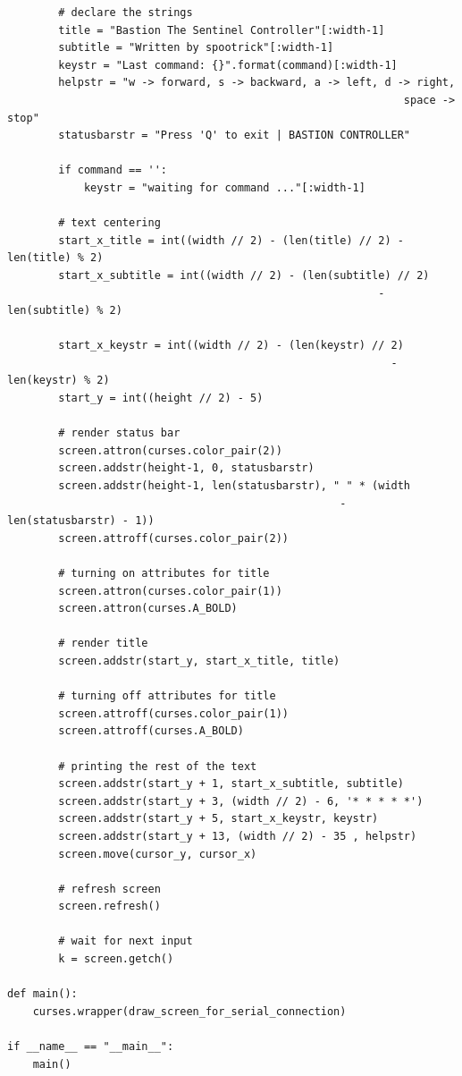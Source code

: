 \documentclass[12pt,a4paper]{article}
\begin{document}
\begin{verbatim}
        # declare the strings
        title = "Bastion The Sentinel Controller"[:width-1]
        subtitle = "Written by spootrick"[:width-1]
        keystr = "Last command: {}".format(command)[:width-1]
        helpstr = "w -> forward, s -> backward, a -> left, d -> right, 
                                                              space -> stop"
        statusbarstr = "Press 'Q' to exit | BASTION CONTROLLER"

        if command == '':
            keystr = "waiting for command ..."[:width-1]

        # text centering
        start_x_title = int((width // 2) - (len(title) // 2) - len(title) % 2)
        start_x_subtitle = int((width // 2) - (len(subtitle) // 2) 
                                                          - len(subtitle) % 2)
                                                          
        start_x_keystr = int((width // 2) - (len(keystr) // 2) 
                                                            - len(keystr) % 2)
        start_y = int((height // 2) - 5)

        # render status bar
        screen.attron(curses.color_pair(2))
        screen.addstr(height-1, 0, statusbarstr)
        screen.addstr(height-1, len(statusbarstr), " " * (width
                                                    - len(statusbarstr) - 1))
        screen.attroff(curses.color_pair(2))

        # turning on attributes for title
        screen.attron(curses.color_pair(1))
        screen.attron(curses.A_BOLD)

        # render title
        screen.addstr(start_y, start_x_title, title)

        # turning off attributes for title
        screen.attroff(curses.color_pair(1))
        screen.attroff(curses.A_BOLD)

        # printing the rest of the text
        screen.addstr(start_y + 1, start_x_subtitle, subtitle)
        screen.addstr(start_y + 3, (width // 2) - 6, '* * * * *')
        screen.addstr(start_y + 5, start_x_keystr, keystr)
        screen.addstr(start_y + 13, (width // 2) - 35 , helpstr)
        screen.move(cursor_y, cursor_x)

        # refresh screen
        screen.refresh()

        # wait for next input
        k = screen.getch()

def main():
    curses.wrapper(draw_screen_for_serial_connection)

if __name__ == "__main__":
    main()
\end{verbatim}
\end{document}
